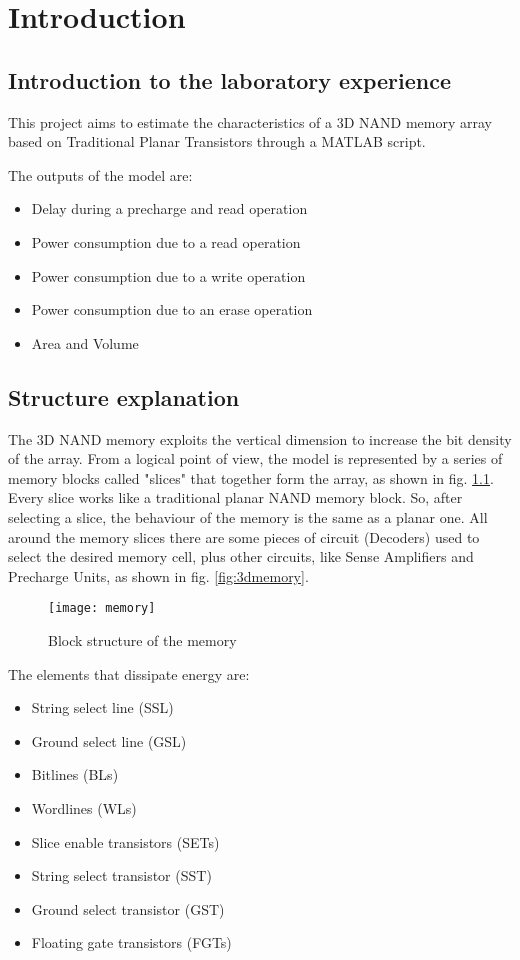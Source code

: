 \chapter{Introduction}
\graphicspath{{foto/Chap1/}}
\section{Introduction to the laboratory experience}
This project aims to estimate the characteristics of a 3D NAND memory array based on Traditional Planar Transistors through a MATLAB script.

The outputs of the model are:
\begin{itemize}[noitemsep, topsep=0pt]
\item Delay during a precharge and read operation
\item Power consumption due to a read operation
\item Power consumption due to a write operation
\item Power consumption due to an erase operation
\item Area and Volume
\end{itemize}

\section{Structure explanation}
The 3D NAND memory exploits the vertical dimension to increase the bit density of the array. From a logical point of view, the model is represented by a series of memory blocks called "slices" that together form the array, as shown in fig. \ref{fig:memory}. Every slice works like a traditional planar NAND memory block. So, after selecting a slice, the behaviour of the memory is the same as a planar one. All around the memory slices there are some pieces of circuit (Decoders) used to select the desired memory cell, plus other circuits, like Sense Amplifiers and Precharge Units, as shown in fig. \ref{fig:3dmemory}.

\begin{figure}[H] 
	\begin{center}
		\texttt{[image: memory]}
	\end{center}
	\caption{Block structure of the memory} 
	\label{fig:memory}
\end{figure} 

The elements that dissipate energy are:

\begin{itemize}
\item String select line (SSL)
\item Ground select line (GSL)
\item Bitlines (BLs)
\item Wordlines (WLs)
\item Slice enable transistors (SETs)
\item String select transistor (SST)
\item Ground select transistor (GST)
\item Floating gate transistors (FGTs)
\end{itemize}

